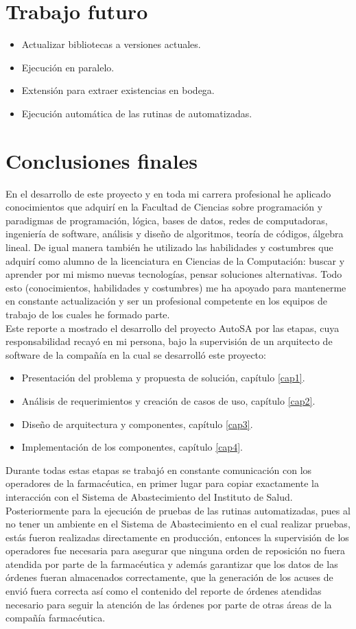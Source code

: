 \section{Trabajo futuro}
\begin{itemize}
	\item Actualizar bibliotecas a versiones actuales.
	\item Ejecución en paralelo.
	\item Extensión para extraer existencias en bodega.
	\item Ejecución automática de las rutinas de automatizadas.
\end{itemize}

\section{Conclusiones finales}
En el desarrollo de este proyecto y en toda mi carrera profesional he aplicado conocimientos que adquirí en la Facultad de Ciencias sobre programación y paradigmas de programación, lógica, bases de datos, redes de computadoras, ingeniería de software, análisis y diseño de algoritmos, teoría de códigos, álgebra lineal. De igual manera también he utilizado las habilidades y costumbres que adquirí como alumno de la licenciatura en Ciencias de la Computación: buscar y aprender por mi mismo nuevas tecnologías, pensar soluciones alternativas. Todo esto (conocimientos, habilidades y costumbres) me ha apoyado para mantenerme en constante actualización y ser un profesional competente en los equipos de trabajo de los cuales he formado parte.\\
Este reporte a mostrado el desarrollo del proyecto AutoSA por las etapas, cuya responsabilidad recayó en mi persona, bajo la supervisión de un arquitecto de software de la compañía en la cual se desarrolló este proyecto:
\begin{itemize}
 	\item Presentación del problema y propuesta de solución, capítulo \ref{cap1}. 
 	\item Análisis de requerimientos y creación de casos de uso, capítulo \ref{cap2}.
 	\item Diseño de arquitectura y componentes, capítulo \ref{cap3}.
 	\item Implementación de los componentes, capítulo \ref{cap4}.
\end{itemize} 
Durante todas estas etapas se trabajó en constante comunicación con los operadores de la farmacéutica, en primer lugar para copiar exactamente la interacción con el Sistema de Abastecimiento del Instituto de Salud. Posteriormente para la ejecución de pruebas de las rutinas automatizadas, pues al no tener un ambiente en el Sistema de Abastecimiento en el cual realizar pruebas, estás fueron realizadas directamente en producción, entonces la supervisión de los operadores fue necesaria para asegurar que ninguna orden de reposición no fuera atendida por parte de la farmacéutica y además garantizar que los datos de las órdenes fueran almacenados correctamente, que la generación de los acuses de envió fuera correcta así como el contenido del reporte de órdenes atendidas necesario para seguir la atención de las órdenes por parte de otras áreas de la compañía farmacéutica.\\

